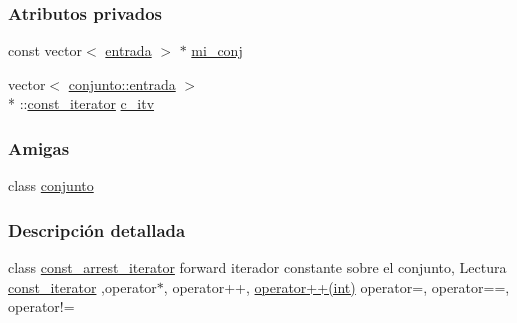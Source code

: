 \subsubsection*{Atributos privados}
\begin{DoxyCompactItemize}
\item 
const vector$<$ \hyperlink{classconjunto_a09cad766dd65de73e51eae21f9d22585}{entrada} $>$ $\ast$ \hyperlink{classconjunto_1_1const__arrest__iterator_a1bb0ece70b2a5986b1f17b2a54493272}{mi\-\_\-conj}
\item 
vector$<$ \hyperlink{classconjunto_a09cad766dd65de73e51eae21f9d22585}{conjunto\-::entrada} $>$\\*
\-::\hyperlink{classconjunto_1_1const__iterator}{const\-\_\-iterator} \hyperlink{classconjunto_1_1const__arrest__iterator_a3240c715891b3cd5ecf77e8747043fc9}{c\-\_\-itv}
\end{DoxyCompactItemize}
\subsubsection*{Amigas}
\begin{DoxyCompactItemize}
\item 
class \hyperlink{classconjunto_1_1const__arrest__iterator_a42fdcda39c77eabd7380e29fcdbe5dd2}{conjunto}
\end{DoxyCompactItemize}


\subsubsection{Descripción detallada}
class \hyperlink{classconjunto_1_1const__arrest__iterator}{const\-\_\-arrest\-\_\-iterator} forward iterador constante sobre el conjunto, Lectura \hyperlink{classconjunto_1_1const__iterator}{const\-\_\-iterator} ,operator$\ast$, operator++, \hyperlink{classconjunto_1_1const__arrest__iterator_abd10935467e56b74188eacc8b5cebe60}{operator++(int)} operator=, operator==, operator!= 

